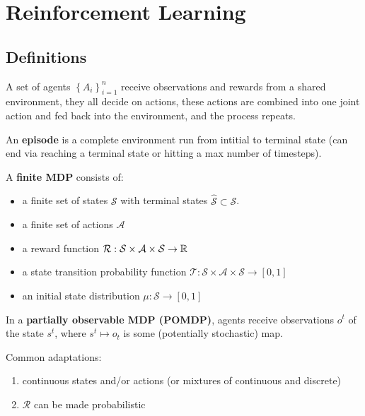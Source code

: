 \documentclass[twoside,10pt]{report}
\begin{document}
\toc
\footer


\chapter{Reinforcement Learning}


\section{Definitions}

A set of agents $\left\{ A_{i} \right\}_{i=1}^{n}$ receive observations and rewards from a shared environment, they all decide on actions, these actions are combined into one joint action and fed back into the environment, and the process repeats.

An \textbf{episode} is a complete environment run from intitial to terminal state (can end via reaching a terminal state or hitting a max number of timesteps).

\begin{defn}[MDP]
A \textbf{finite MDP} consists of:
\begin{itemize}
	\item a finite set of states $\mathcal{S}$ with terminal states $\hat{\mathcal{S}} \subset \mathcal{S}$.
	\item a finite set of actions $\mathcal{A}$ 
	\item a reward function $\mathcal{R}: \mathcal{S} \times \mathcal{A} \times \mathcal{S}\to \mathbb{R}$ 
	\item a state transition probability function $\mathcal{T} : \mathcal{S} \times \mathcal{A} \times \mathcal{S} \to [0, 1]$
	\item an initial state distribution $\mu : \mathcal{S} \to [0,1]$
\end{itemize}

In a \textbf{partially observable MDP (POMDP)}, agents receive observations $o^{t}$ of the state $s^{t}$, where $s^{t}\mapsto o_{t}$ is some (potentially stochastic) map.
\end{defn}

Common adaptations:
\begin{enumerate}
	\item continuous states and/or actions (or mixtures of continuous and discrete)
	\item $\mathcal{R}$ can be made probabilistic
\end{enumerate}
\end{document}
